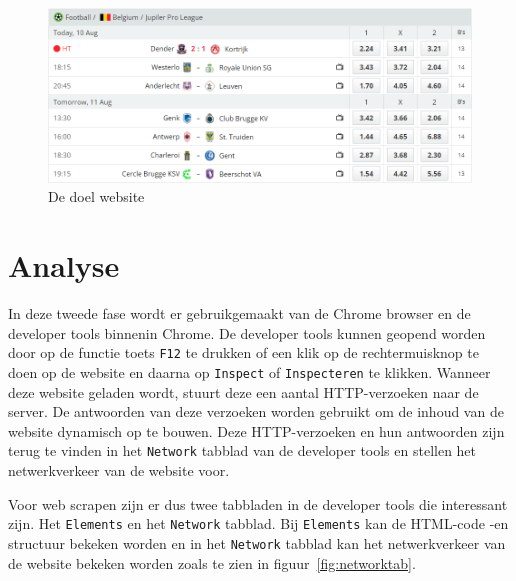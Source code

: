 \begin{figure}[h]
    \centering
    \includegraphics[width=\linewidth]{graphics/website1.png}
    \caption{De doel website}
    \label{fig:website1}
\end{figure}

\section{Analyse}
In deze tweede fase wordt er gebruikgemaakt van de Chrome browser en de developer tools binnenin Chrome. De developer tools kunnen geopend worden door op de functie toets \texttt{F12} te drukken of een klik op de rechtermuisknop te doen op de website en daarna op \texttt{Inspect} of \texttt{Inspecteren} te klikken. Wanneer deze website geladen wordt, stuurt deze een aantal HTTP-verzoeken naar de server. De antwoorden van deze verzoeken worden gebruikt om de inhoud van de website dynamisch op te bouwen. Deze HTTP-verzoeken en hun antwoorden zijn terug te vinden in het \texttt{Network} tabblad van de developer tools en stellen het netwerkverkeer van de website voor.

Voor web scrapen zijn er dus twee tabbladen in de developer tools die interessant zijn. Het \texttt{Elements} en het \texttt{Network} tabblad. Bij \texttt{Elements} kan de HTML-code -en structuur bekeken worden en in het \texttt{Network} tabblad kan het netwerkverkeer van de website bekeken worden zoals te zien in figuur~\ref{fig:networktab}. 

